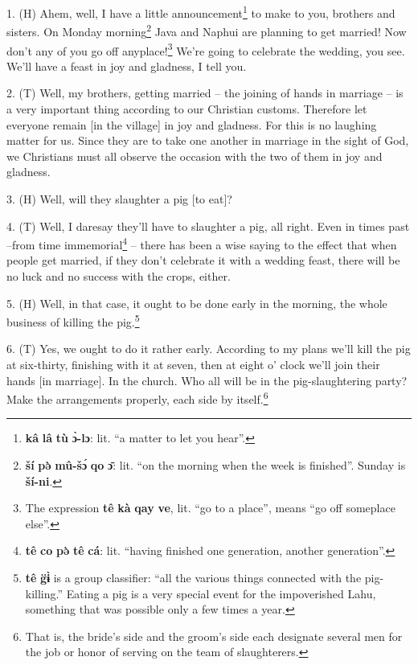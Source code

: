 \setcounter{footnote}{0}

1. (H) Ahem, well, I have a little announcement\footnote{\textbf{kâ} \textbf{lâ} \textbf{tù} \textbf{ɔ̀-lɔ}: lit. ``a matter to let you hear''.} to make to you, brothers and
sisters. On Monday morning\footnote{\textbf{ší} \textbf{pə̀} \textbf{mû-šɔ́} \textbf{qo} \textbf{ɔ̄}: lit. ``on the morning when the week is finished''. Sunday is \textbf{ší-ni}.} Java and Naphui are planning to get married! Now
don't any of you go off anyplace!\footnote{The expression \textbf{tê} \textbf{kà} \textbf{qay} \textbf{ve}, lit. ``go to a place'', means ``go off someplace else''.} We're going to celebrate the wedding, you
see. We'll have a feast in joy and gladness, I tell you.

2. (T) Well, my brothers, getting married -- the joining of hands in marriage --
is a very important thing according to our Christian customs. Therefore let everyone
remain [in the village] in joy and gladness. For this is no laughing matter for
us. Since they are to take one another in marriage in the sight of God, we Christians
must all observe the occasion with the two of them in joy and gladness.

3. (H) Well, will they slaughter a pig [to eat]?

4. (T) Well, I daresay they'll have to slaughter a pig, all right. Even in times
past --from time immemorial\footnote{\textbf{tê} \textbf{co} \textbf{pə̀} \textbf{tê} \textbf{cá}: lit. ``having finished one generation, another generation''.} -- there has been a wise saying to the effect that
when people get married, if they don't celebrate it with a wedding feast, there
will be no luck and no success with the crops, either.

5. (H) Well, in that case, it ought to be done early in the morning, the whole
business of killing the pig.\footnote{\textbf{tê} \textbf{g̈ɨ̀} is a group classifier: ``all the various things connected with the pig-killing.'' Eating a pig is a very special event for the impoverished Lahu, something that was possible only a few times a year.}

6. (T) Yes, we ought to do it rather early. According to my plans we'll kill the
pig at six-thirty, finishing with it at seven, then at eight o' clock we'll join
their hands [in marriage]. In the church. Who all will be in the pig-slaughtering
party? Make the arrangements properly, each side by itself.\footnote{That is, the bride's side and the groom's side each designate several men for the job or honor of serving on the team of slaughterers.}

